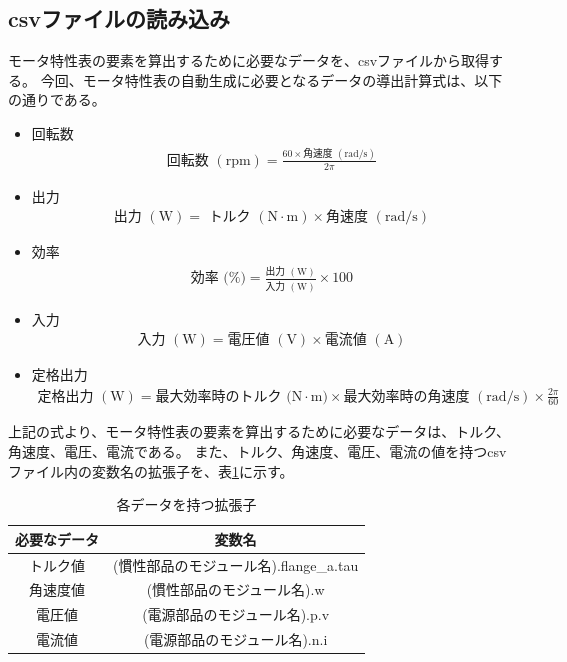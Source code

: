 \subsection{csvファイルの読み込み}\label{sub:csv_scan}
モータ特性表の要素を算出するために必要なデータを、csvファイルから取得する。
今回、モータ特性表の自動生成に必要となるデータの導出計算式は、以下の通りである。
\begin{itemize}
    \item 回転数
    \begin{eqnarray}
        \mbox{回転数 $(\mathrm{rpm})$} = \frac{60 \times \mbox{角速度 $(\mathrm{rad/s})$}}{2\pi}   \label{siki:speed}
    \end{eqnarray}

    \item 出力 
    \begin{eqnarray}
        \mbox{出力 $(\mathrm{W})$} = \mbox{ トルク $(\mathrm{N \cdot m})$} \times \mbox{角速度 $(\mathrm{rad/s})$} \label{siki:out}
    \end{eqnarray}
    \item 効率
    \begin{eqnarray}
        \mbox{効率 (\%)} = \frac{\mbox{出力 $(\mathrm{W})$}}{\mbox{入力 $(\mathrm{W})$}}  \times 100 \label{siki:effi}
    \end{eqnarray}
    \item 入力
    \begin{eqnarray}
        \mbox{入力 $(\mathrm{W})$} = \mbox{電圧値 $(\mathrm{V})$} \times \mbox{電流値 $(\mathrm{A})$} 　\label{siki:in}
    \end{eqnarray}
    \item 定格出力
    \begin{eqnarray}
        \mbox{定格出力 $(\mathrm{W})$} = \mbox{最大効率時のトルク $(\mathrm{N \cdot m)}$} \times \mbox{最大効率時の角速度  $(\mathrm{rad/s})$} \times \frac{2\pi}{60}　
        \label{siki:teikaku}
    \end{eqnarray}
     
\end{itemize}

上記の式より、モータ特性表の要素を算出するために必要なデータは、トルク、角速度、電圧、電流である。
また、トルク、角速度、電圧、電流の値を持つcsvファイル内の変数名の拡張子を、表\ref{tab:hensuu}に示す。　
\begin{table}[t]
	\centering
	\caption{各データを持つ拡張子}
	\begin{tabular}{|c|c|} \hline
	  必要なデータ & 変数名 \\ \hline \hline
	  トルク値 & (慣性部品のモジュール名).flange\_a.tau \\ \hline
	  角速度値 &  (慣性部品のモジュール名).w \\ \hline
	  電圧値 &  (電源部品のモジュール名).p.v \\ \hline
	  電流値 &  (電源部品のモジュール名).n.i \\ \hline
	\end{tabular}
	\label{tab:hensuu}
  \end{table}

